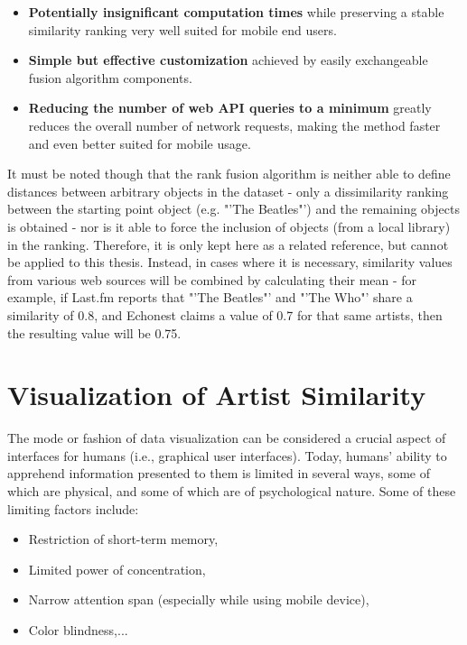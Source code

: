 \begin{itemize}
	\item \textbf{Potentially insignificant computation times} while preserving a stable similarity ranking very well suited for mobile end users.
	\item \textbf{Simple but effective customization} achieved by easily exchangeable fusion algorithm components.
	\item \textbf{Reducing the number of web API queries to a minimum} greatly reduces the overall number of network requests, making the method faster and even better suited for mobile usage.
\end{itemize}

It must be noted though that the rank fusion algorithm is neither able to define distances between arbitrary objects in the dataset - only a dissimilarity ranking between the starting point object (e.g. "'The Beatles"') and the remaining objects is obtained - nor is it able to force the inclusion of objects (from a local library) in the ranking.
Therefore, it is only kept here as a related reference, but cannot be applied to this thesis. Instead, in cases where it is necessary, similarity values from various web sources will be combined by calculating their mean - for example, if Last.fm reports that "'The Beatles"' and "'The Who"' share a similarity of 0.8, and Echonest claims a value of 0.7 for that same artists, then the resulting value will be 0.75.

\section{Visualization of Artist Similarity}

The mode or fashion of data visualization can be considered a crucial aspect of interfaces for humans (i.e., graphical user interfaces). Today, humans' ability to apprehend information presented to them is limited in several ways, some of which are physical, and some of which are of psychological nature. Some of these limiting factors include:

\begin{itemize}
	\item Restriction of short-term memory,
	\item Limited power of concentration,
	\item Narrow attention span (especially while using mobile device),
	\item Color blindness,...
\end{itemize}

